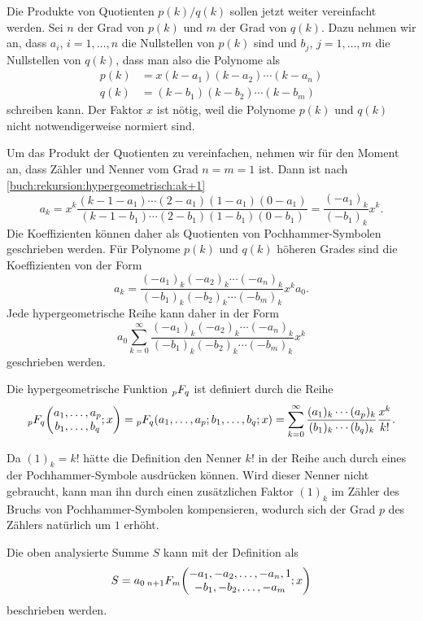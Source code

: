 Die Produkte von Quotienten $p(k)/q(k)$ sollen jetzt weiter
vereinfacht werden.
Sei $n$ der Grad von $p(k)$ und $m$ der Grad von $q(k)$.
Dazu nehmen wir an, dass $a_i$, $i=1,\dots,n$ die Nullstellen von $p(k)$ sind
und $b_j$, $j=1,\dots,m$ die Nullstellen von $q(k)$, dass man also
die Polynome als
\begin{align*}
p(k) &= x(k-a_1)(k-a_2)\cdots(k-a_n)
\\
q(k) &= (k-b_1)(k-b_2)\cdots(k-b_m)
\end{align*}
schreiben kann.
Der Faktor $x$ ist nötig, weil die Polynome $p(k)$ und $q(k)$ nicht
notwendigerweise normiert sind.

Um das Produkt der Quotienten zu vereinfachen, nehmen wir für den Moment
an, dass Zähler und Nenner vom Grad $n=m=1$ ist.
Dann ist nach 
\eqref{buch:rekursion:hypergeometrisch:ak+1}
\[
a_{k}
=
x^{k}
\frac{
(k-1-a_1) \cdots (2-a_1)(1-a_1)(0-a_1)
}{
(k-1-b_1) \cdots (2-b_1)(1-b_1)(0-b_1)
}
=
\frac{(-a_1)_k}{(-b_1)_k} x^k.
\]
Die Koeffizienten können daher als Quotienten von Pochhammer-Symbolen
geschrieben werden.
Für Polynome $p(k)$ und $q(k)$ höheren Grades sind die Koeffizienten
von der Form
\[
a_k
=
\frac{(-a_1)_k(-a_2)_k\cdots (-a_n)_k}{(-b_1)_k(-b_2)_k\cdots(-b_m)_k}
x^ka_0.
\]
Jede hypergeometrische Reihe kann daher in der Form
\[
a_0
\sum_{k=0}^\infty
\frac{(-a_1)_k(-a_2)_k\cdots (-a_n)_k}{(-b_1)_k(-b_2)_k\cdots(-b_m)_k}
x^k
\]
geschrieben werden.

\begin{definition}
\label{buch:rekursion:hypergeometrisch:def}
Die hypergeometrische Funktion
$\mathstrut_pF_q$ ist definiert durch die Reihe
\[
\mathstrut_pF_q
\biggl(
\begin{matrix}
a_1,\dots,a_p\\
b_1,\dots,b_q
\end{matrix}
;
x
\biggr)
=
\mathstrut_pF_q(a_1,\dots,a_p;b_1,\dots,b_q;x)
=
\sum_{k=0}^\infty
\frac{(a_1)_k\cdots(a_p)_k}{(b_1)_k\cdots(b_q)_k}\frac{x^k}{k!}.
\]
\end{definition}

Da $(1)_k=k!$ hätte die Definition den Nenner $k!$ in der Reihe
auch durch eines der Pochhammer-Symbole ausdrücken können.
Wird dieser Nenner nicht gebraucht, kann man ihn durch einen 
zusätzlichen Faktor $(1)_k$ im Zähler des Bruchs von Pochhammer-Symbolen
kompensieren, wodurch sich der Grad $p$ des Zählers natürlich um $1$
erhöht.

Die oben analysierte Summe $S$ kann mit der Definition als
\[
S
=
a_0
\,
\mathstrut_{n+1}F_m \biggl(
\begin{matrix}
-a_1,-a_2,\dots,-a_n,1\\
-b_1,-b_2,\dots,-a_m
\end{matrix}; x
\biggr)
\]
beschrieben werden.

